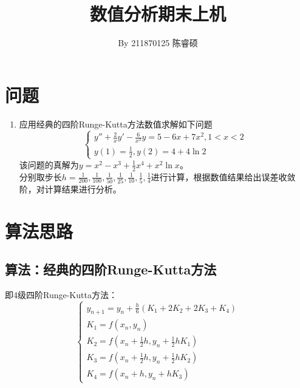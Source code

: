 \documentclass[a4paper,11pt,notitlepage]{article}
\title{\vspace{-1.5cm} \textbf{\huge{数值分析期末上机}}\vspace{-1em}}
\author{By 211870125 陈睿硕}
\date{}
\begin{document}
\maketitle
\vspace{-1cm}
\thispagestyle{fancy}

\section{问题}
\begin{adjustwidth}{1em}{0pt}
\begin{enumerate}[label=\textbf{Q\arabic*}]
    \item 
    应用经典的四阶Runge-Kutta方法数值求解如下问题
    \[    
    \begin{cases}
            y''+\frac{2}{x}y'-\frac{6}{x^2}y=5-6x+7x^2,1<x<2\\
            y(1)=\frac{1}{2},y(2)=4+4\ln 2 
    \end{cases}
    \]
该问题的真解为$y=x^2-x^3+\frac{1}{2}x^4+x^2\ln x$。\\
分别取步长$h=\frac{1}{200},\frac{1}{100},\frac{1}{50},\frac{1}{25},\frac{1}{10},
    \frac{1}{5},\frac{1}{4}$进行计算，根据数值结果给出误差收敛阶，对计算结果进行分析。\label{Q1}\notag
\end{enumerate}
\end{adjustwidth}

\section{算法思路}
\subsection{算法：经典的四阶Runge-Kutta方法}
即4级四阶Runge-Kutta方法：
\[
\begin{cases}
        y_{n+1}=y_n+\frac{h}{6}(K_1+2K_2+2K_3+K_4)\\
        K_1=f(x_n,y_n)\\
        K_2=f(x_n+\frac{1}{2}h,y_n+\frac{1}{2}hK_1)\\
        K_3=f(x_n+\frac{1}{2}h,y_n+\frac{1}{2}hK_2)\\
        K_4=f(x_n+h,y_n+hK_3)
\end{cases}
\]
\end{document}
